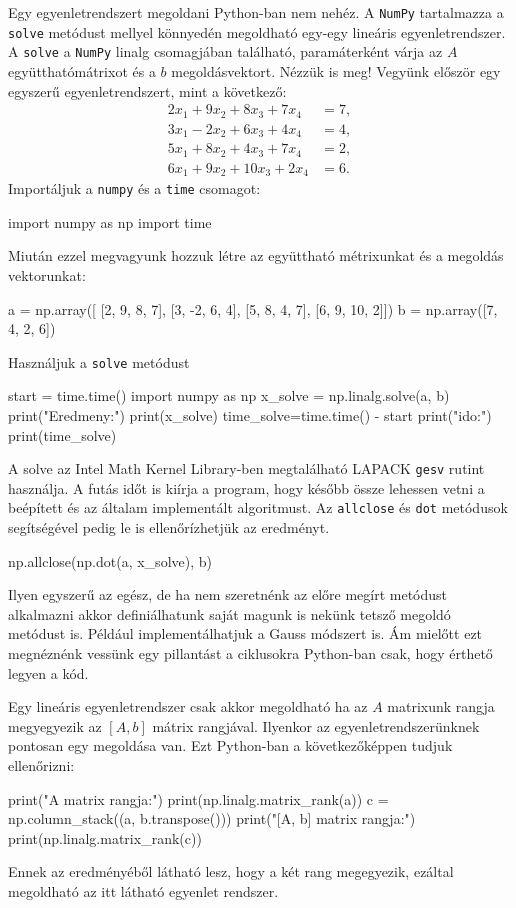 Egy egyenletrendszert megoldani Python-ban nem nehéz. A \texttt{NumPy}
tartalmazza a \texttt{solve} metódust mellyel könnyedén megoldható
egy-egy lineáris egyenletrendszer. A \texttt{solve} a \texttt{NumPy}
linalg csomagjában található, paramáterként várja az \(A\)
együtthatómátrixot és a \(b\) megoldásvektort. Nézzük is meg!
Vegyünk először egy egyszerű egyenletrendszert, mint a következő:
\begin{align*}
    2x_1 + 9x_2 + 8x_3 + 7x_4 &= 7, \\
    3x_1 - 2x_2 + 6x_3 + 4x_4 &= 4, \\
    5x_1 + 8x_2 + 4x_3 + 7x_4 &= 2, \\
    6x_1 + 9x_2 + 10x_3 + 2x_4 &= 6.
\end{align*}
Importáljuk a \texttt{numpy} és a \texttt{time} csomagot:
\begin{python}
import numpy as np
import time
\end{python}
Miután ezzel megvagyunk hozzuk létre az együttható métrixunkat és a
megoldás vektorunkat:
\begin{python}
a = np.array([
    [2,  9, 8,  7],
    [3, -2, 6,  4],
    [5,  8, 4,  7],
    [6,  9, 10, 2]])
b = np.array([7, 4, 2, 6])
\end{python}
Használjuk a \texttt{solve} metódust
\begin{python}
start = time.time()
import numpy as np
x_solve = np.linalg.solve(a, b)
print("Eredmeny:")
print(x_solve)
time_solve=time.time() - start
print("\nFutasi ido:\n")
print(time_solve)
\end{python}
    A solve az Intel Math Kernel Library-ben megtalálható LAPACK \texttt{gesv} rutint
használja.
A futás időt is kiírja a program, hogy később össze lehessen vetni a
beépített és az általam implementált algoritmust. Az \texttt{allclose}
és \texttt{dot} metódusok segítségével pedig le is ellenőrízhetjük az
eredményt.
\begin{python}
np.allclose(np.dot(a, x_solve), b)
\end{python}       
    Ilyen egyszerű az egész, de ha nem szeretnénk az előre megírt metódust
alkalmazni akkor definiálhatunk saját magunk is nekünk tetsző megoldó
metódust is. Például implementálhatjuk a Gauss módszert is. Ám mielőtt
ezt megnéznénk vessünk egy pillantást a ciklusokra Python-ban csak, hogy
érthető legyen a kód.

    Egy lineáris egyenletrendszer csak akkor megoldható ha az $A$ matrixunk
rangja megyegyezik az $[A, b]$ mátrix rangjával. Ilyenkor az
egyenletrendszerünknek pontosan egy megoldása van. Ezt Python-ban a
következőképpen tudjuk ellenőrizni:
\begin{python}
print("A matrix rangja:")
print(np.linalg.matrix_rank(a))
c = np.column_stack((a, b.transpose()))
print("[A, b] matrix rangja:")
print(np.linalg.matrix_rank(c))
\end{python}
Ennek az eredményéből látható lesz, hogy a két rang megegyezik, ezáltal megoldható az itt látható
egyenlet rendszer.

